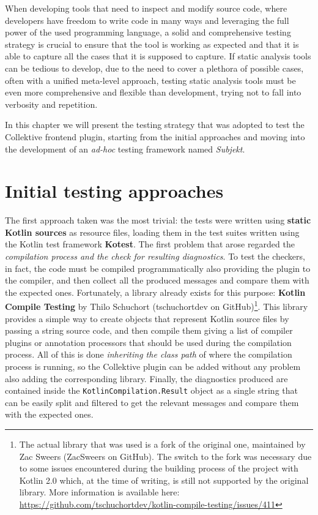\documentclass[12pt,a4paper,openright,twoside]{book}
\begin{document}
When developing tools that need to inspect and modify source code, where
developers have freedom to write code in many ways and leveraging the full power of the 
used programming language, a solid and comprehensive testing strategy is crucial to 
ensure that the tool is working as expected and that it is able to capture all the
cases that it is supposed to capture.
%
If static analysis tools can be tedious to develop, due to the need to cover a
plethora of possible cases, often with a unified meta-level approach, testing
static analysis tools must be even more comprehensive and flexible than
development, trying not to fall into verbosity and repetition.

In this chapter we will present the testing strategy that was adopted to test the 
Collektive frontend plugin, starting from the initial approaches and moving into the 
development of an \emph{ad-hoc} testing framework named \emph{Subjekt}.

\section{Initial testing approaches}

The first approach taken was the most trivial: the tests were written using
\textbf{static Kotlin sources} as resource files, loading them in the test
suites written using the Kotlin test framework \textbf{Kotest}. The first
problem that arose regarded the \emph{compilation process and the check for
resulting diagnostics}. To test the checkers, in fact, the code must be compiled
programmatically also providing the plugin to the compiler, and then collect all
the produced messages and compare them with the expected ones.
%
Fortunately, a library already exists for this purpose: \textbf{Kotlin Compile
Testing} by Thilo Schuchort (tschuchortdev on GitHub)\footnote{The actual
library that was used is a fork of the original one, maintained by Zac Sweers
(ZacSweers on GitHub). The switch to the fork was necessary due to some issues
encountered during the building process of the project with Kotlin 2.0 which,
at the time of writing, is still not supported by the original library. More
information is available here:
\url{https://github.com/tschuchortdev/kotlin-compile-testing/issues/411}}.
This library provides a simple way to create objects that represent Kotlin source
files by passing a string source code, and then compile them giving a list of
compiler plugins or annotation processors that should be used during the
compilation process. All of this is done \emph{inheriting the class path} of
where the compilation process is running, so the Collektive plugin can be added
without any problem also adding the corresponding library. Finally, the
diagnostics produced are contained inside the
\lstinline{KotlinCompilation.Result} object as a single string that can be
easily split and filtered to get the relevant messages and compare them with the
expected ones.
\end{document}
